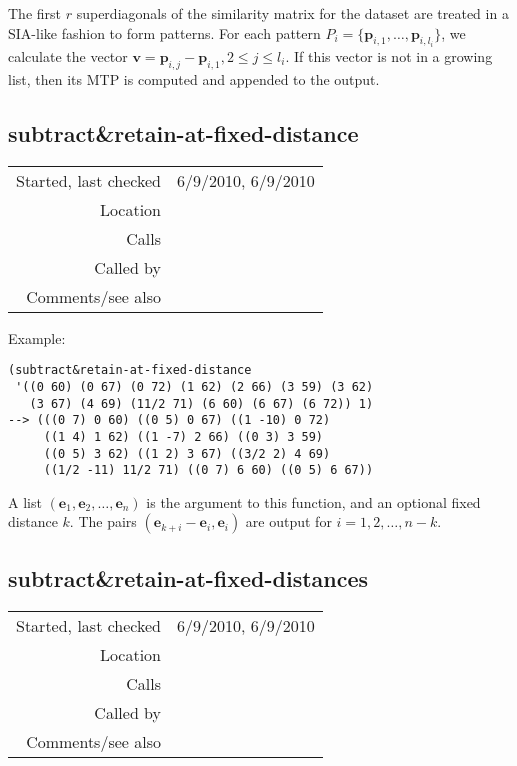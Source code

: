 \noindent The first $r$ superdiagonals of the similarity
matrix for the dataset are treated in a SIA-like
fashion to form patterns. For each pattern
$P_i = \{\mathbf{p}_{i,1},\ldots,
\mathbf{p}_{i,l_i}\}$, we calculate the
vector $\mathbf{v} =
\mathbf{p}_{i,j} - \mathbf{p}_{i,1}, 2 \leq j
\leq l_i$. If this vector is not in a growing list,
then its MTP is computed and appended to the
output.


\subsection*{subtract\&retain-at-fixed-distance}\label{fun:subtractnretain-at-fixed-distance}

\vspace{0.3cm}
\begin{tabular}{r|p{8cm}}
Started, last checked & 6/9/2010, 6/9/2010 \\
Location & \nameref{sec:superdiagonals} \\
Calls & \nameref{fun:subtract-two-lists} \\
Called by & \nameref{fun:subtractnretain-at-fixed-distances} \\
Comments/see also & 
\end{tabular}

\vspace{0.5cm}
\noindent Example:
\begin{verbatim}
(subtract&retain-at-fixed-distance
 '((0 60) (0 67) (0 72) (1 62) (2 66) (3 59) (3 62)
   (3 67) (4 69) (11/2 71) (6 60) (6 67) (6 72)) 1)
--> (((0 7) 0 60) ((0 5) 0 67) ((1 -10) 0 72)
     ((1 4) 1 62) ((1 -7) 2 66) ((0 3) 3 59)
     ((0 5) 3 62) ((1 2) 3 67) ((3/2 2) 4 69)
     ((1/2 -11) 11/2 71) ((0 7) 6 60) ((0 5) 6 67))
\end{verbatim}

\noindent A list $(\mathbf{e}_1, \mathbf{e}_2,
\ldots, \mathbf{e}_n)$ is the argument to this
function, and an optional fixed distance $k$. The
pairs $(\mathbf{e}_{k+i} - \mathbf{e}_i,
\mathbf{e}_i)$ are output for $i = 1, 2,\ldots,
n-k$.


\subsection*{subtract\&retain-at-fixed-distances}\label{fun:subtractnretain-at-fixed-distances}

\vspace{0.3cm}
\begin{tabular}{r|p{8cm}}
Started, last checked & 6/9/2010, 6/9/2010 \\
Location & \nameref{sec:superdiagonals} \\
Calls & \nameref{fun:subtractnretain-at-fixed-distance} \\
Called by & \nameref{fun:structure-induction-algorithm-r} \\
Comments/see also & 
\end{tabular}


